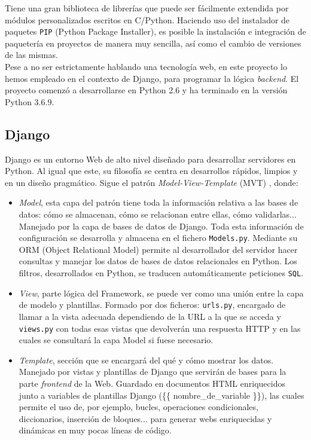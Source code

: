 \documentclass[a4paper, 12pt]{book}
\begin{document}
		Tiene una gran biblioteca de librerías que puede ser fácilmente extendida por módulos personalizados escritos en C/Python. Haciendo uso del instalador de paquetes \texttt{PIP} (Python Package Installer), es posible la instalación e integración de paquetería en proyectos de manera muy sencilla, así como el cambio de versiones de las mismas.\\
		
		Pese a no ser estrictamente hablando una tecnología web, en este proyecto lo hemos empleado en el contexto de Django, para programar la lógica \textit{backend}. El proyecto comenzó a desarrollarse en Python 2.6 y ha terminado en la versión Python 3.6.9.
		
	\subsection{Django}
	\label{subsec:django}
		Django es un entorno Web de alto nivel diseñado para desarrollar servidores en Python. Al igual que este, su filosofía se centra en desarrollos rápidos, limpios y en un diseño pragmático. Sigue el patrón \textit{Model-View-Template} (MVT) \cite{Django MVC}, donde:
		
		\begin{itemize}
			\item \textit{Model}, esta capa del patrón tiene toda la información relativa a las bases de datos: cómo se almacenan, cómo se relacionan entre ellas, cómo validarlas... Manejado por la capa de bases de datos de Django. Toda esta información de configuración se desarrolla y almacena en el fichero \texttt{Models.py}. Mediante su ORM (Object Relational Model) permite al desarrollador del servidor hacer consultas y manejar los datos de bases de datos relacionales en Python. Los filtros, desarrollados en Python, se traducen automáticamente peticiones \texttt{SQL}.
			
			\item \textit{View}, parte lógica del Framework, se puede ver como una unión entre la capa de modelo y plantillas. Formado por dos ficheros: \texttt{urls.py}, encargado de llamar a la vista adecuada dependiendo de la URL a la que se acceda y \texttt{views.py} con todas esas vistas que devolverán una respuesta HTTP y en las cuales se consultará la capa Model si fuese necesario.
			
			
			\item \textit{Template}, sección que se encargará del qué y cómo mostrar los datos. Manejado por vistas y plantillas de Django que servirán de bases para la parte \textit{frontend} de la Web. Guardado en documentos HTML enriquecidos junto a variables de plantillas Django (\{\{ nombre\_de\_variable \}\}), las cuales permite el uso de, por ejemplo, bucles, operaciones condicionales, diccionarios, inserción de bloques... para generar webs enriquecidas y dinámicas en muy pocas líneas de código.
			
		\end{itemize}
\end{document}
